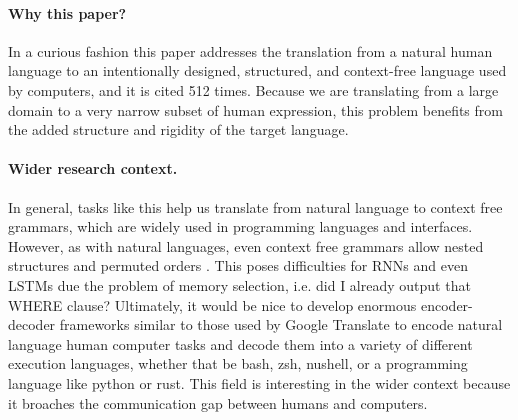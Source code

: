 \paragraph{Why this paper?}
In a curious fashion this paper addresses the translation from a natural human
language to an intentionally designed, structured, and context-free language
used by computers, and it is cited 512 times. Because we are translating
from a large domain to a very narrow subset of human expression, this problem
benefits from the added structure and rigidity of the target language.

\paragraph{Wider research context.}
In general, tasks like this help us translate from natural language to context
free grammars, which are widely used in programming languages and interfaces.
However, as with natural languages, even context free grammars allow nested
structures and permuted orders \cite{zeng2020recparser, allamanis2018survey}.
This poses difficulties for RNNs and even LSTMs due the problem of memory
selection, i.e. did I already output that WHERE clause? Ultimately, it would be
nice to develop enormous encoder-decoder frameworks similar to those used by
Google Translate to encode natural language human computer tasks and decode
them into a variety of different execution languages, whether that be bash,
zsh, nushell, or a programming language like python or rust. This field is
interesting in the wider context because it broaches the communication gap
between humans and computers.
